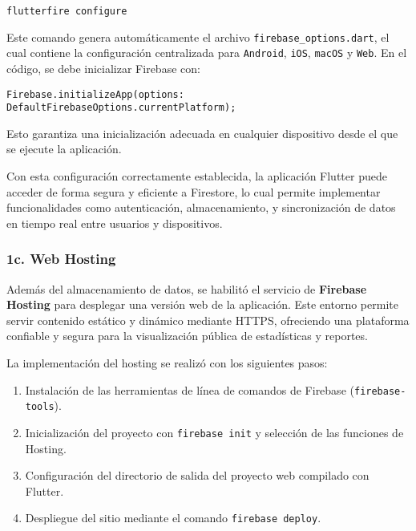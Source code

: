\begin{center}
  \texttt{flutterfire configure}
\end{center}

Este comando genera automáticamente el archivo \texttt{firebase\_options.dart}, el cual contiene la configuración centralizada para \texttt{Android}, \texttt{iOS}, \texttt{macOS} y \texttt{Web}. En el código, se debe inicializar Firebase con:

\begin{center}
  \texttt{Firebase.initializeApp(options: DefaultFirebaseOptions.currentPlatform);}
\end{center}

Esto garantiza una inicialización adecuada en cualquier dispositivo desde el que se ejecute la aplicación.

\vspace{1em}

Con esta configuración correctamente establecida, la aplicación Flutter puede acceder de forma segura y eficiente a Firestore, lo cual permite implementar funcionalidades como autenticación, almacenamiento, y sincronización de datos en tiempo real entre usuarios y dispositivos.


\subsubsection{1c. Web Hosting}
Además del almacenamiento de datos, se habilitó el servicio de \textbf{Firebase Hosting} para desplegar una versión web de la aplicación. Este entorno permite servir contenido estático y dinámico mediante HTTPS, ofreciendo una plataforma confiable y segura para la visualización pública de estadísticas y reportes.

La implementación del hosting se realizó con los siguientes pasos:

\begin{enumerate}
    \item Instalación de las herramientas de línea de comandos de Firebase (\texttt{firebase-tools}).
    \item Inicialización del proyecto con \texttt{firebase init} y selección de las funciones de Hosting.
    \item Configuración del directorio de salida del proyecto web compilado con Flutter.
    \item Despliegue del sitio mediante el comando \texttt{firebase deploy}.
\end{enumerate}






